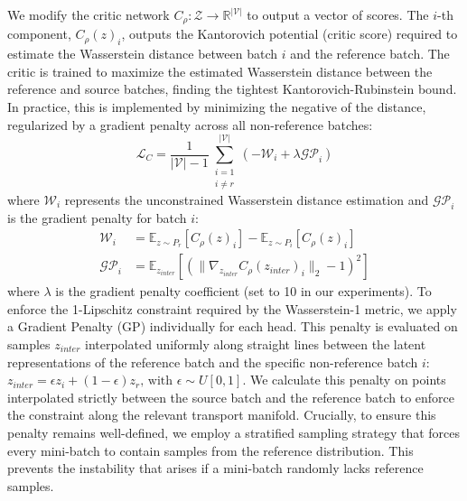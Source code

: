 \documentclass[unnumsec,webpdf,contemporary,large]{oup-authoring-template}%
\theoremstyle{thmstyleone}%
\theoremstyle{thmstyletwo}%
\theoremstyle{thmstylethree}%
\begin{document}
We modify the critic network $C_\rho: \mathcal{Z} \to \mathbb{R}^{\lvert \mathcal{V} \rvert}$ to output a vector of scores. The $i$-th component, $C_\rho(z)_i$, outputs the Kantorovich potential (critic score) required to estimate the Wasserstein distance between batch $i$ and the reference batch. The critic is trained to maximize the estimated Wasserstein distance between the reference and source batches, finding the tightest Kantorovich-Rubinstein bound. In practice, this is implemented by minimizing the negative of the distance, regularized by a gradient penalty across all non-reference batches:
\begin{equation*}
    \mathcal{L}_C = \frac{1}{\lvert \mathcal{V} \rvert-1} \sum_{\substack{i=1 \\ i \neq r}}^{\lvert \mathcal{V} \rvert} \left( -\mathcal{W}_i + \lambda \mathcal{GP}_i \right)
\end{equation*}
where $\mathcal{W}_i$ represents the unconstrained Wasserstein distance estimation and $\mathcal{GP}_i$ is the gradient penalty for batch $i$:
\begin{align*}
    \mathcal{W}_i &= \mathbb{E}_{z \sim P_r} [C_\rho(z)_i] - \mathbb{E}_{z \sim P_i} [C_\rho(z)_i]
    \\
    \mathcal{GP}_i &= \mathbb{E}_{z_{inter}} \left[ \left( \| \nabla_{z_{inter}} C_\rho(z_{inter})_i \|_2 - 1 \right)^2 \right] 
\end{align*}
where $\lambda$ is the gradient penalty coefficient (set to 10 in our experiments). To enforce the 1-Lipschitz constraint required by the Wasserstein-1 metric, we apply a Gradient Penalty (GP) \citep{10.5555/3295222.3295327} individually for each head. This penalty is evaluated on samples $z_{inter}$ interpolated uniformly along straight lines between the latent representations of the reference batch and the specific non-reference batch $i$: $z_{inter} = \epsilon z_i + (1 - \epsilon) z_r \text{, with } \epsilon \sim U[0, 1]$. We calculate this penalty on points interpolated strictly between the source batch and the reference batch to enforce the constraint along the relevant transport manifold. Crucially, to ensure this penalty remains well-defined, we employ a stratified sampling strategy that forces every mini-batch to contain samples from the reference distribution. This prevents the instability that arises if a mini-batch randomly lacks reference samples. 
\end{document}
